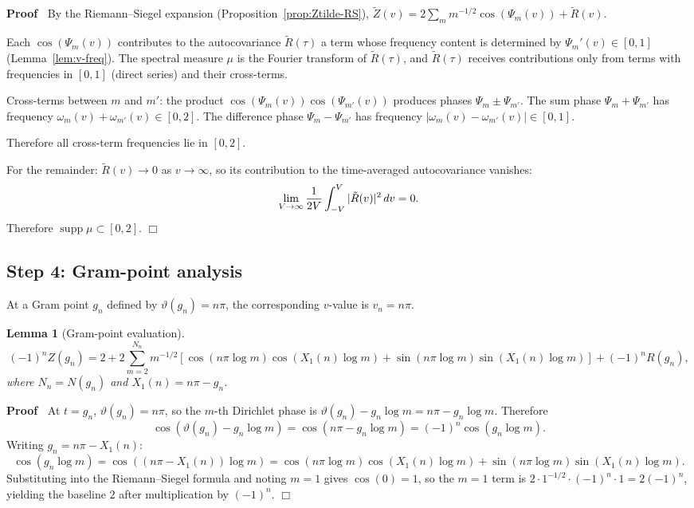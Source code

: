 \documentclass{article}
\newcommand{\tmop}[1]{\ensuremath{\operatorname{#1}}}
\newenvironment{proof}{\noindent\textbf{Proof\ }}{\hspace*{\fill}$\Box$\medskip}
\newtheorem{lemma}{Lemma}
\newcommand{\supp}{\tmop{supp}}
\begin{document}
\begin{proof}
  By the Riemann--Siegel expansion (Proposition~\ref{prop:Ztilde-RS}),
  $\tilde{Z} (v) = 2 \sum_m m^{- 1 / 2} \cos (\Psi_m (v)) + \tilde{R} (v)$.
  
  Each $\cos (\Psi_m (v))$ contributes to the autocovariance $\tilde{R}
  (\tau)$ a term whose frequency content is determined by $\Psi_m' (v) \in [0,
  1]$ (Lemma~\ref{lem:v-freq}). The spectral measure $\mu$ is the Fourier
  transform of $\tilde{R} (\tau)$, and $\tilde{R} (\tau)$ receives
  contributions only from terms with frequencies in $[0, 1]$ (direct series)
  and their cross-terms.
  
  Cross-terms between $m$ and $m'$: the product $\cos (\Psi_m (v)) \cos
  (\Psi_{m'} (v))$ produces phases $\Psi_m \pm \Psi_{m'}$. The sum phase
  $\Psi_m + \Psi_{m'}$ has frequency $\omega_m (v) + \omega_{m'} (v) \in [0,
  2]$. The difference phase $\Psi_m - \Psi_{m'}$ has frequency $| \omega_m (v)
  - \omega_{m'} (v) | \in [0, 1]$.
  
  Therefore all cross-term frequencies lie in $[0, 2]$.
  
  For the remainder: $\tilde{R} (v) \to 0$ as $v \to \infty$, so its
  contribution to the time-averaged autocovariance vanishes:
  \[ \lim_{V \to \infty}  \frac{1}{2 V}  \int_{- V}^V | \tilde{R} (v) |^2 
     \hspace{0.17em} dv = 0. \]
  Therefore $\supp \mu \subset [0, 2]$.
\end{proof}

\subsection*{Step 4: Gram-point analysis}

At a Gram point $g_n$ defined by $\vartheta (g_n) = n \pi$, the corresponding
$v$-value is $v_n = n \pi$.

\begin{lemma}
  [Gram-point evaluation]\label{lem:gram-eval}
  \begin{equation}
    \label{eq:gram-eval} (- 1)^n Z (g_n) = 2 + 2 \sum_{m = 2}^{N_n} m^{- 1 /
    2}  [\cos (n \pi \log m) \cos (X_1 (n) \log m) + \sin (n \pi \log m) \sin
    (X_1 (n) \log m)] + (- 1)^n R (g_n),
  \end{equation}
  where $N_n = N (g_n)$ and $X_1 (n) = n \pi - g_n$.
\end{lemma}

\begin{proof}
  At $t = g_n$, $\vartheta (g_n) = n \pi$, so the $m$-th Dirichlet phase is
  $\vartheta (g_n) - g_n \log m = n \pi - g_n \log m$. Therefore
  \[ \cos (\vartheta (g_n) - g_n \log m) = \cos (n \pi - g_n \log m) = (- 1)^n
     \cos (g_n \log m) . \]
  Writing $g_n = n \pi - X_1 (n)$:
  \[ \cos (g_n \log m) = \cos ((n \pi - X_1 (n)) \log m) = \cos (n \pi \log m)
     \cos (X_1 (n) \log m) + \sin (n \pi \log m) \sin (X_1 (n) \log m) . \]
  Substituting into the Riemann--Siegel formula and noting $m = 1$ gives $\cos
  (0) = 1$, so the $m = 1$ term is $2 \cdot 1^{- 1 / 2} \cdot (- 1)^n \cdot 1
  = 2 (- 1)^n$, yielding the baseline $2$ after multiplication by $(- 1)^n$.
\end{proof}
\end{document}
